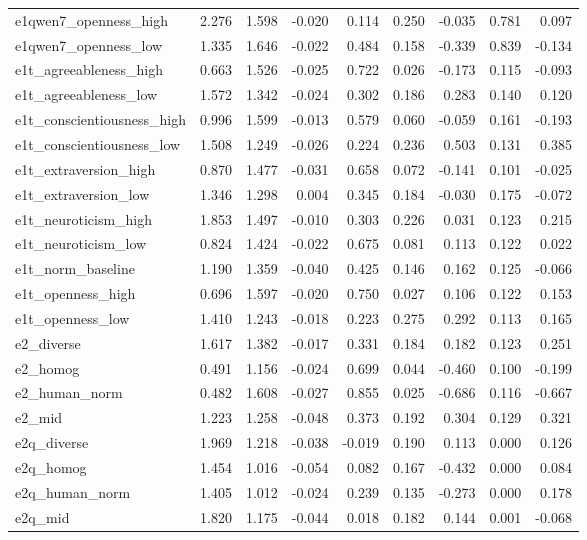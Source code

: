 \documentclass[11pt]{article}
\begin{document}
\begin{landscape}
\begin{longtable}{@{}lrrrrrrrr@{}}
e1qwen7\_openness\_high & 2.276 & 1.598 & -0.020 & 0.114 & 0.250 & -0.035 & 0.781 & 0.097 \\
e1qwen7\_openness\_low & 1.335 & 1.646 & -0.022 & 0.484 & 0.158 & -0.339 & 0.839 & -0.134 \\
e1t\_agreeableness\_high & 0.663 & 1.526 & -0.025 & 0.722 & 0.026 & -0.173 & 0.115 & -0.093 \\
e1t\_agreeableness\_low & 1.572 & 1.342 & -0.024 & 0.302 & 0.186 & 0.283 & 0.140 & 0.120 \\
e1t\_conscientiousness\_high & 0.996 & 1.599 & -0.013 & 0.579 & 0.060 & -0.059 & 0.161 & -0.193 \\
e1t\_conscientiousness\_low & 1.508 & 1.249 & -0.026 & 0.224 & 0.236 & 0.503 & 0.131 & 0.385 \\
e1t\_extraversion\_high & 0.870 & 1.477 & -0.031 & 0.658 & 0.072 & -0.141 & 0.101 & -0.025 \\
e1t\_extraversion\_low & 1.346 & 1.298 & 0.004 & 0.345 & 0.184 & -0.030 & 0.175 & -0.072 \\
e1t\_neuroticism\_high & 1.853 & 1.497 & -0.010 & 0.303 & 0.226 & 0.031 & 0.123 & 0.215 \\
e1t\_neuroticism\_low & 0.824 & 1.424 & -0.022 & 0.675 & 0.081 & 0.113 & 0.122 & 0.022 \\
e1t\_norm\_baseline & 1.190 & 1.359 & -0.040 & 0.425 & 0.146 & 0.162 & 0.125 & -0.066 \\
e1t\_openness\_high & 0.696 & 1.597 & -0.020 & 0.750 & 0.027 & 0.106 & 0.122 & 0.153 \\
e1t\_openness\_low & 1.410 & 1.243 & -0.018 & 0.223 & 0.275 & 0.292 & 0.113 & 0.165 \\
e2\_diverse & 1.617 & 1.382 & -0.017 & 0.331 & 0.184 & 0.182 & 0.123 & 0.251 \\
e2\_homog & 0.491 & 1.156 & -0.024 & 0.699 & 0.044 & -0.460 & 0.100 & -0.199 \\
e2\_human\_norm & 0.482 & 1.608 & -0.027 & 0.855 & 0.025 & -0.686 & 0.116 & -0.667 \\
e2\_mid & 1.223 & 1.258 & -0.048 & 0.373 & 0.192 & 0.304 & 0.129 & 0.321 \\
e2q\_diverse & 1.969 & 1.218 & -0.038 & -0.019 & 0.190 & 0.113 & 0.000 & 0.126 \\
e2q\_homog & 1.454 & 1.016 & -0.054 & 0.082 & 0.167 & -0.432 & 0.000 & 0.084 \\
e2q\_human\_norm & 1.405 & 1.012 & -0.024 & 0.239 & 0.135 & -0.273 & 0.000 & 0.178 \\
e2q\_mid & 1.820 & 1.175 & -0.044 & 0.018 & 0.182 & 0.144 & 0.001 & -0.068 \\

\end{longtable}
\end{landscape}
\end{document}
